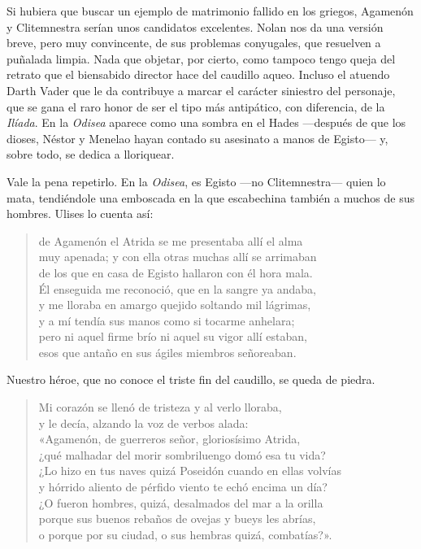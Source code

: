 
Si hubiera que buscar un ejemplo de matrimonio fallido en los griegos, Agamenón y Clitemnestra serían unos candidatos excelentes. Nolan nos da una versión breve, pero muy convincente, de sus problemas conyugales, que resuelven a puñalada limpia. Nada que objetar, por cierto, como tampoco tengo queja del retrato que el biensabido director hace del caudillo aqueo. Incluso el atuendo Darth Vader que le da contribuye a marcar el carácter siniestro del personaje, que se gana el raro honor de ser el tipo más antipático, con diferencia, de la \emph{Ilíada}. En la \emph{Odisea} aparece como una sombra en el Hades ---después de que los dioses, Néstor y Menelao hayan contado su asesinato a manos de Egisto--- y, sobre todo, se dedica a lloriquear.

Vale la pena repetirlo. En la \emph{Odisea}, es Egisto ---no Clitemnestra--- quien lo mata, tendiéndole una emboscada en la que escabechina también a muchos de sus hombres. Ulises lo cuenta así:

\begin{verse}
de Agamenón el Atrida se me presentaba allí el alma\\
muy apenada; y con ella otras muchas allí se arrimaban\\
de los que en casa de Egisto hallaron con él hora mala.\\
Él enseguida me reconoció, que en la sangre ya andaba,\\
y me lloraba en amargo quejido soltando mil lágrimas,\\
y a mí tendía sus manos como si tocarme anhelara;\\
pero ni aquel firme brío ni aquel su vigor allí estaban,\\
esos que antaño en sus ágiles miembros señoreaban.
\end{verse}

Nuestro héroe, que no conoce el triste fin del caudillo, se queda de piedra.

\begin{verse}
Mi corazón se llenó de tristeza y al verlo lloraba,\\
y le decía, alzando la voz de verbos alada:\\
«Agamenón, de guerreros señor, gloriosísimo Atrida,\\
¿qué malhadar del morir sombriluengo domó esa tu vida?\\
¿Lo hizo en tus naves quizá Poseidón cuando en ellas volvías\\
y hórrido aliento de pérfido viento te echó encima un día?\\
¿O fueron hombres, quizá, desalmados del mar a la orilla\\
porque sus buenos rebaños de ovejas y bueys les abrías,\\
o porque por su ciudad, o sus hembras quizá, combatías?».
\end{verse}


